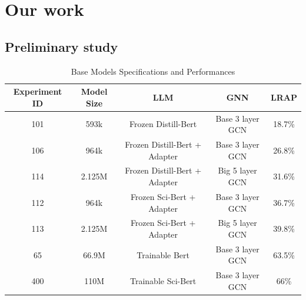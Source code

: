 \pagebreak

\section{Our work}
\subsection*{Preliminary study}
\label{sec:preliminary study}

\begin{table}[h]
    \centering
    \begin{tabular}{|c|c|c|c|c|}
    \hline
    \textbf{Experiment ID} & \textbf{Model Size} & \textbf{LLM} & \textbf{GNN} & \textbf{LRAP} \\ \hline
    101         & 593k                & Frozen Distill-Bert           & Base 3 layer GCN       & 18.7\%      \\ \hline
    106         & 964k                & Frozen Distill-Bert + Adapter & Base 3 layer GCN       & 26.8\%      \\ \hline
    114         & 2.125M              & Frozen Distill-Bert + Adapter & Big 5 layer GCN        & 31.6\%      \\ \hline
    112         & 964k                & Frozen Sci-Bert + Adapter     & Base 3 layer GCN       & 36.7\%      \\ \hline
    113         & 2.125M              & Frozen Sci-Bert + Adapter     & Big 5 layer GCN        & 39.8\%      \\ \hline
    65          & 66.9M               & Trainable Bert                & Base 3 layer GCN       & 63.5\%      \\ \hline
    400         & 110M                & Trainable Sci-Bert            & Base 3 layer GCN       & 66\%        \\ \hline
    \end{tabular}
    \caption{Base Models Specifications and Performances}
    \label{tab:preliminary_study_metrics}
\end{table}


